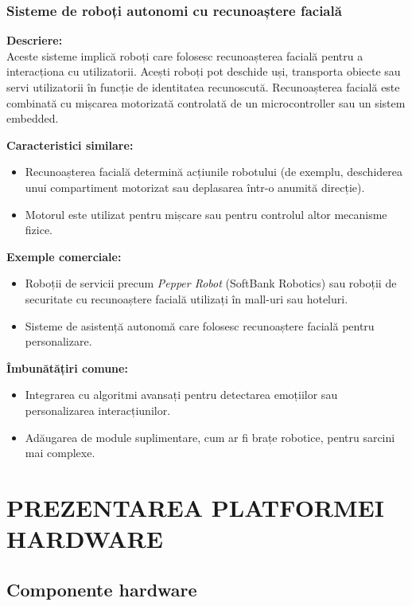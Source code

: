 \documentclass[a4paper,12pt]{report}
\begin{document}
\subsection{Sisteme de roboți autonomi cu recunoaștere facială}
\textbf{Descriere:} \\
Aceste sisteme implică roboți care folosesc recunoașterea facială pentru a interacționa cu utilizatorii. Acești roboți pot deschide uși, transporta obiecte sau servi utilizatorii în funcție de identitatea recunoscută. Recunoașterea facială este combinată cu mișcarea motorizată controlată de un microcontroller sau un sistem embedded.

\textbf{Caracteristici similare:}
\begin{itemize}
    \item Recunoașterea facială determină acțiunile robotului (de exemplu, deschiderea unui compartiment motorizat sau deplasarea într-o anumită direcție).
    \item Motorul este utilizat pentru mișcare sau pentru controlul altor mecanisme fizice.
\end{itemize}

\textbf{Exemple comerciale:}
\begin{itemize}
    \item Roboții de servicii precum \textit{Pepper Robot} (SoftBank Robotics) sau roboții de securitate cu recunoaștere facială utilizați în mall-uri sau hoteluri.
    \item Sisteme de asistență autonomă care folosesc recunoaștere facială pentru personalizare.
\end{itemize}

\textbf{Îmbunătățiri comune:}
\begin{itemize}
    \item Integrarea cu algoritmi avansați pentru detectarea emoțiilor sau personalizarea interacțiunilor.
    \item Adăugarea de module suplimentare, cum ar fi brațe robotice, pentru sarcini mai complexe.
\end{itemize}



\chapter*{PREZENTAREA PLATFORMEI HARDWARE}

\section{Componente hardware}
\end{document}
